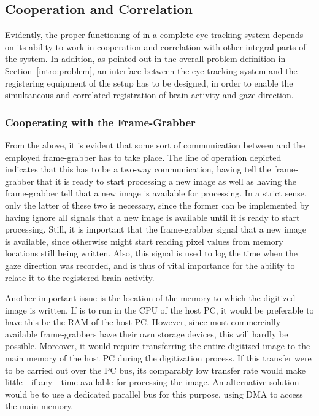 \subsection{Cooperation and Correlation}
\label{algo:future:cooperate}

Evidently, the proper functioning of {\octopus} in a complete
eye-tracking system depends on its ability to work in cooperation and
correlation with other integral parts of the system.  In addition, as
pointed out in the overall problem definition in
Section~\ref{intro:problem}, an interface between the eye-tracking
system and the registering equipment of the setup has to be designed,
in order to enable the simultaneous and correlated registration of
brain activity and gaze direction.

\subsubsection{Cooperating with the Frame-Grabber}

From the above, it is evident that some sort of communication between
{\octopus} and the employed frame-grabber has to take place.  The line
of operation depicted indicates that this has to be a two-way
communication, having {\octopus} tell the frame-grabber that it is
ready to start processing a new image as well as having the
frame-grabber tell {\octopus} that a new image is available for
processing.  In a strict sense, only the latter of these two is
necessary, since the former can be implemented by having {\octopus}
ignore all signals that a new image is available until it is ready to
start processing.  Still, it is important that the frame-grabber
signal that a new image is available, since otherwise {\octopus} might
start reading pixel values from memory locations still being written.
Also, this signal is used to log the time when the gaze direction was
recorded, and is thus of vital importance for the ability to relate it
to the registered brain activity.

Another important issue is the location of the memory to which the
digitized image is written.  If {\octopus} is to run in the CPU of the
host PC, it would be preferable to have this be the RAM of the host
PC.  However, since most commercially available frame-grabbers have
their own storage devices, this will hardly be possible.  Moreover, it
would require transferring the entire digitized image to the main
memory of the host PC during the digitization process.  If this
transfer were to be carried out over the PC bus, its comparably low
transfer rate would make little---if any---time available for
processing the image.  An alternative solution would be to use a
dedicated parallel bus for this purpose, using DMA to access the main
memory.  

